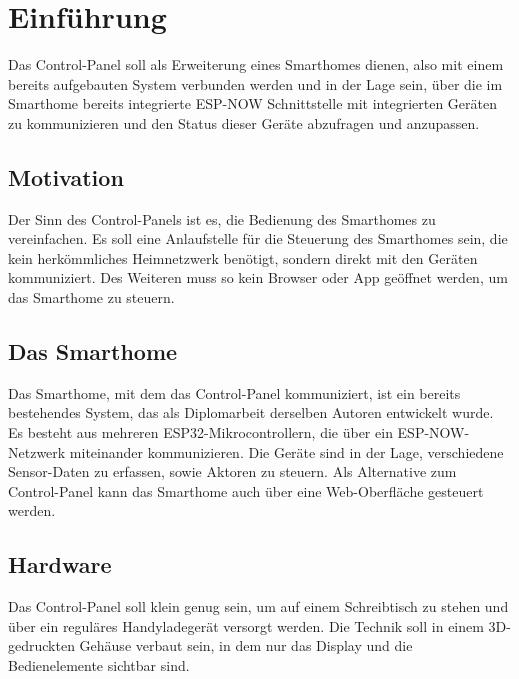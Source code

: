 \chapter{Einführung}

Das Control-Panel soll als Erweiterung eines Smarthomes dienen, also
mit einem bereits aufgebauten System verbunden werden und in der Lage sein, 
über die im Smarthome bereits integrierte ESP-NOW Schnittstelle mit 
integrierten Geräten zu kommunizieren und den Status dieser Geräte 
abzufragen und anzupassen.

    \section{Motivation}
    Der Sinn des Control-Panels ist es, die Bedienung des Smarthomes zu vereinfachen.
    Es soll eine Anlaufstelle für die Steuerung des Smarthomes sein, die kein
    herkömmliches Heimnetzwerk benötigt, sondern direkt mit den Geräten kommuniziert.
    Des Weiteren muss so kein Browser oder App geöffnet werden, um das Smarthome zu 
    steuern.

    \section{Das Smarthome}
    Das Smarthome, mit dem das Control-Panel kommuniziert, ist ein bereits 
    bestehendes System, das als Diplomarbeit derselben Autoren entwickelt wurde.
    Es besteht aus mehreren ESP32-Mikrocontrollern, die über ein ESP-NOW-Netzwerk
    miteinander kommunizieren. Die Geräte sind in der Lage, verschiedene 
    Sensor-Daten zu erfassen, sowie Aktoren zu steuern. Als Alternative zum
    Control-Panel kann das Smarthome auch über eine Web-Oberfläche gesteuert werden.

    \section{Hardware}
    Das Control-Panel soll klein genug sein, um auf einem Schreibtisch zu stehen
    und über ein reguläres Handyladegerät versorgt werden. Die Technik 
    soll in einem 3D-gedruckten Gehäuse verbaut sein, in dem nur das Display und
    die Bedienelemente sichtbar sind. 

        
        
